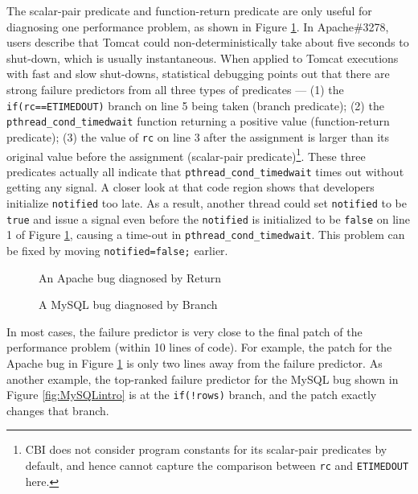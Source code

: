 The scalar-pair predicate and function-return predicate are only useful
for diagnosing one performance problem, as shown in 
Figure \ref{fig:Apache3278}.
In Apache\#3278, users describe that Tomcat could
non-deterministically take about five seconds to shut-down, which is usually
instantaneous. When applied to Tomcat executions
with fast and slow shut-downs, statistical debugging points out that there are
strong failure predictors from all three types of predicates --- 
(1) the \texttt{if(rc==ETIMEDOUT)} branch on line 5 being taken (branch predicate);
(2) the \texttt{pthread\_cond\_timedwait} function returning 
a positive value (function-return predicate);
(3) the value of \texttt{rc} on line 3 after the assignment is larger than its
original value before the assignment 
(scalar-pair predicate)\footnote{CBI does not consider program constants
for its scalar-pair predicates by default, and hence
cannot capture the comparison between \texttt{rc} and \texttt{ETIMEDOUT} here.}.
These three predicates actually all indicate that 
\texttt{pthread\_cond\_timedwait}
times out without getting any signal. 
A closer look at that code region shows that developers initialize
\texttt{notified} too late. 
As a result, another thread
could set \texttt{notified} to be \texttt{true} and issue a signal even
before the \texttt{notified} is initialized to be \texttt{false} on line 1 of
Figure \ref{fig:Apache3278}, causing a time-out in \texttt{pthread\_cond\_timedwait}. 
This problem can be fixed by moving \texttt{notified=false;} earlier.


\begin{figure}
\centering

\caption{An Apache bug diagnosed by Return}
\label{fig:Apache3278}
\end{figure}




\begin{figure}
\centering

\caption{A MySQL bug diagnosed by Branch}
\label{fig:MySQL44723}
\end{figure}

In most cases, the failure predictor
is very close to the final patch of the performance problem (within 10 lines
of code).
For example, the patch for the Apache bug in Figure 
\ref{fig:Apache3278} is only two lines away from the failure predictor.
As another example, 
the top-ranked failure predictor for the MySQL bug shown in 
Figure \ref{fig:MySQLintro} is at the \lstinline{if(!rows)} branch, and
the patch exactly changes that branch. 





